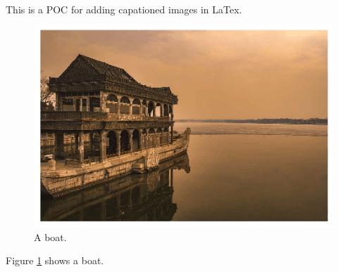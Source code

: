 \documentclass{article}
\begin{document}
\paragraph{}
This is a POC for adding capationed images in LaTex.

\begin{figure}
    \includegraphics[width=\linewidth]{boat.png}
    \caption[boat]{A boat.}
    \label{fig:boat1}
\end{figure}

Figure \ref{fig:boat1} shows a boat.
\end{document}
